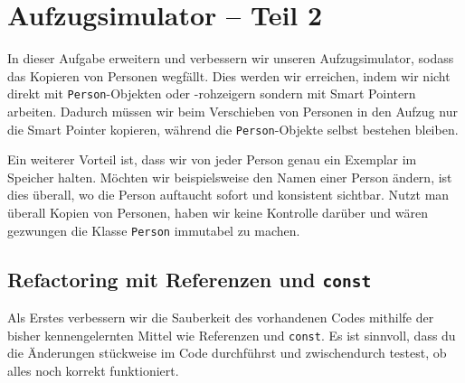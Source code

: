\section{\ExercisePrefixElevator Aufzugsimulator -- Teil 2 \optional}

\optionaltextbox

In dieser Aufgabe erweitern und verbessern wir unseren Aufzugsimulator, sodass das Kopieren von Personen wegfällt.
Dies werden wir erreichen, indem wir nicht direkt mit \lstinline{Person}-Objekten oder -rohzeigern sondern mit Smart Pointern arbeiten.
Dadurch müssen wir beim Verschieben von Personen in den Aufzug nur die Smart Pointer kopieren, während die \lstinline{Person}-Objekte selbst bestehen bleiben.

Ein weiterer Vorteil ist, dass wir von jeder Person genau ein Exemplar im Speicher halten.
Möchten wir beispielsweise den Namen einer Person ändern, ist dies überall, wo die Person auftaucht sofort und konsistent sichtbar.
Nutzt man überall Kopien von Personen, haben wir keine Kontrolle darüber und wären gezwungen die Klasse \lstinline{Person} immutabel zu machen. \\


\subsection{Refactoring mit Referenzen und \lstinline{const}}
Als Erstes verbessern wir die Sauberkeit des vorhandenen Codes mithilfe der bisher kennengelernten Mittel wie Referenzen und \lstinline{const}.
Es ist sinnvoll, dass du die Änderungen stückweise im Code durchführst und zwischendurch testest, ob alles noch korrekt funktioniert.

